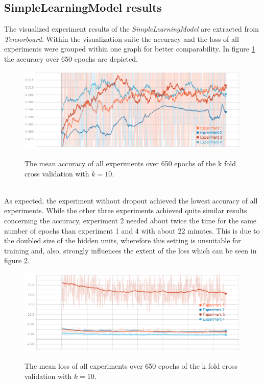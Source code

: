\subsection{SimpleLearningModel results}
\label{subsec:slmexperiment}	
The visualized experiment results of the \textit{SimpleLearningModel} are extracted from \textit{Tensorboard}. Within the visualization suite the accuracy and the loss of all experiments were grouped within one graph for better comparability. In figure \ref{fig:acc650epochs} the accuracy over 650 epochs are depicted. 
\begin{figure}[!ht]
	\caption{The mean accuracy of all experiments over 650 epochs of the k fold cross validation with $k=10$. }
	\includegraphics[width=0.95\linewidth]{images/evaluation/slm-k-accuracy.png}
	\label{fig:acc650epochs}
\end{figure}
\\ As expected, the experiment without dropout achieved the lowest accuracy of all experiments. While the other three experiments achieved quite similar results concerning the accuracy, experiment 2 needed about twice the time for the same number of epochs than experiment 1 and 4 with about 22 minutes. This is due to the doubled size of the hidden units, wherefore this setting is unsuitable for training and, also, strongly influences the extent of the loss which can be seen in figure \ref{fig:loss650epochs}. 
\begin{figure}[!ht]
	\caption{The mean loss of all experiments over 650 epochs of the k fold cross validation with $k=10$. }
	\includegraphics[width=0.95\linewidth]{images/evaluation/slm-k-losses.png}
	\label{fig:loss650epochs}
\end{figure}
